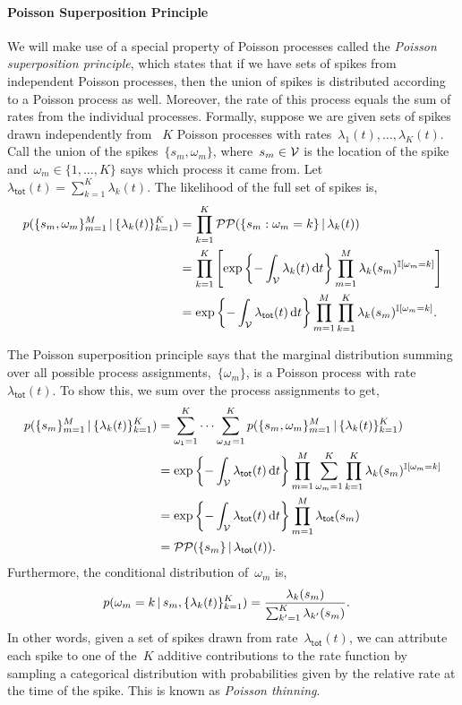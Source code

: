 \paragraph{Poisson Superposition Principle}
We will make use of a special property of Poisson processes called the
\emph{Poisson superposition principle}, which states that if we have 
sets of spikes from independent Poisson processes, then the union of spikes 
is distributed according to a Poisson process as well.
Moreover, the rate of this process equals the sum of 
rates from the individual processes. 
Formally, suppose we are given sets of spikes drawn independently
from ~$K$ Poisson processes with rates~${\lambda_1(t), \ldots,
  \lambda_K(t)}$.  Call the union of the spikes~${\{s_m,
  \omega_m\}}$, where~${s_m \in \mathcal{V}}$ is the location of the spike
and~${\omega_m \in \{1, \ldots, K\}}$ says which process it came
from. Let~${\lambda_{\mathsf{tot}}(t) = \sum_{k=1}^K \lambda_k(t)}$.
The likelihood of the full set of spikes is,
\begin{align*}
  p(\{s_m, \omega_m\}_{m=1}^M \,|\, \{\lambda_k(t)\}_{k=1}^K)
  &= \prod_{k=1}^K \mathcal{PP}(\{s_m: \omega_m=k\} \,|\, \lambda_k(t)) \\
  &= \prod_{k=1}^K \left[
    \exp\left\{-\int_{\mathcal{V}} \lambda_k(t) \, \mathrm{d}t\right\}
    \prod_{m=1}^M \lambda_k(s_m)^{\mathbb{I}[\omega_m = k]} \right] \\
  &= \exp\left\{-\int_{\mathcal{V}} \lambda_{\mathsf{tot}}(t) \, \mathrm{d}t\right\}
  \prod_{m=1}^M \prod_{k=1}^K \lambda_k(s_m)^{\mathbb{I}[\omega_m = k]}.
\end{align*}

The Poisson superposition principle says that the marginal distribution
summing over all possible process assignments,~$\{\omega_m\}$, is a Poisson
process with rate~$\lambda_{\mathsf{tot}}(t)$. To show this, we sum over
the process assignments to get,
\begin{align*}
  p(\{s_m\}_{m=1}^M \,|\, \{\lambda_k(t)\}_{k=1}^K)
  &= \sum_{\omega_1=1}^K \cdots \sum_{\omega_M=1}^K p(\{s_m, \omega_m\}_{m=1}^M \,|\, \{\lambda_k(t)\}_{k=1}^K) \\
  &= \exp\left\{-\int_{\mathcal{V}} \lambda_{\mathsf{tot}}(t) \, \mathrm{d}t\right\}
  \prod_{m=1}^M \sum_{\omega_m=1}^K \prod_{k=1}^K \lambda_k(s_m)^{\mathbb{I}[\omega_m = k]} \\
  &= \exp\left\{-\int_{\mathcal{V}} \lambda_{\mathsf{tot}}(t) \, \mathrm{d}t\right\}
  \prod_{m=1}^M \lambda_{\mathsf{tot}}(s_m) \\
  &= \mathcal{PP}(\{s_m\} \,|\, \lambda_{\mathsf{tot}}(t)).
\end{align*}
Furthermore, the conditional distribution of~$\omega_m$ is,
\begin{align*}
  p(\omega_m=k \,|\, s_m, \{\lambda_k(t)\}_{k=1}^K)
  &= \frac{\lambda_k(s_m)}{\sum_{k'=1}^K \lambda_{k'}(s_m)}.
\end{align*}
In other words, given a set of spikes drawn from rate~$\lambda_{\mathsf{tot}}(t)$,
we can attribute each spike to one of the~$K$ additive contributions
to the rate function by sampling a categorical distribution with probabilities
given by the relative rate at the time of the spike. This is known as
\emph{Poisson thinning}.

